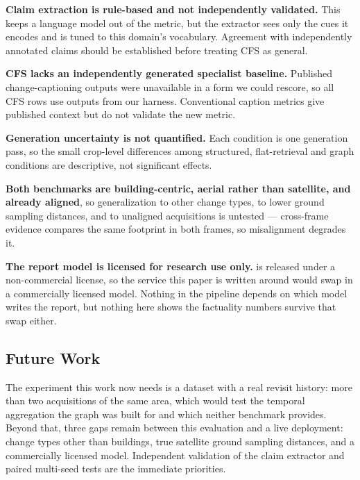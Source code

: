 \textbf{Claim extraction is rule-based and not independently validated.} This
keeps a language model out of the metric, but the extractor sees only the cues
it encodes and is tuned to this domain's vocabulary. Agreement with independently
annotated claims should be established before treating CFS as general.

\textbf{CFS lacks an independently generated specialist baseline.} Published
change-captioning outputs were unavailable in a form we could rescore, so all
CFS rows use outputs from our harness. Conventional caption metrics give
published context but do not validate the new metric.

\textbf{Generation uncertainty is not quantified.} Each condition is one
generation pass, so the small crop-level differences among structured,
flat-retrieval and graph conditions are descriptive, not significant effects.

\textbf{Both benchmarks are building-centric, aerial rather than satellite,
and already aligned}, so generalization to other change types, to lower ground
sampling distances, and to unaligned acquisitions is untested --- cross-frame
evidence compares the same footprint in both frames, so misalignment degrades
it.

\textbf{The report model is licensed for research use only.} \LLMName{} is
released under a non-commercial license, so the service this paper is written
around would swap in a commercially licensed model. Nothing in the pipeline
depends on which model writes the report, but nothing here shows the factuality
numbers survive that swap either.

\subsection{Future Work}

The experiment this work now needs is a dataset with a real revisit history:
more than two acquisitions of the same area, which would test the temporal
aggregation the graph was built for and which neither benchmark provides.
Beyond that, three gaps remain between this evaluation and a live deployment:
change types other than buildings, true satellite ground sampling distances,
and a commercially licensed model. Independent validation of the claim extractor
and paired multi-seed tests are the immediate priorities.
